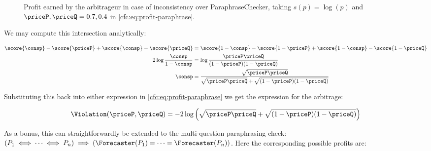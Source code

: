 \begin{figure}
\centering
{}
\caption{Profit earned by the arbitrageur in case of inconsistency over ParaphraseChecker, taking $s(p)=\log(p)$ and $\priceP,\priceQ=0.7,0.4$ in \eqref{cfc:eq:profit-paraphrase}.}
\label{cfc:fig:profit-paraphrase}
\end{figure}

We may compute this intersection analytically:

\begin{align*}
    \score{\consp}-\score{\priceP}+\score{\consp}-\score{\priceQ} &=
    \score{1-\consp}-\score{1-\priceP}+\score{1-\consp}-\score{1-\priceQ} \\
    2\log\frac{\consp}{1-\consp}&=\log\frac{\priceP\priceQ}{(1-\priceP)(1-\priceQ)} \\
    \consp &= \frac{\sqrt{\priceP\priceQ}}{\sqrt{\priceP\priceQ}+\sqrt{(1-\priceP)(1-\priceQ)}} \\
\end{align*}

Substituting this back into either expression in \eqref{cfc:eq:profit-paraphrase} we get the expression for the arbitrage:

\begin{equation}
\Violation(\priceP,\priceQ)=-2\log\left(\sqrt{\priceP\priceQ}+\sqrt{(1-\priceP)(1-\priceQ)}\right)
\label{cfc:eq:arbitrage-paraphrase}
\end{equation}

As a bonus, this can straightforwardly be extended to the multi-question paraphrasing check: $(P_1\iff\dots\iff P_n)\implies(\Forecaster(P_1)=\dots=\Forecaster(P_n))$. Here the corresponding possible profits are:

